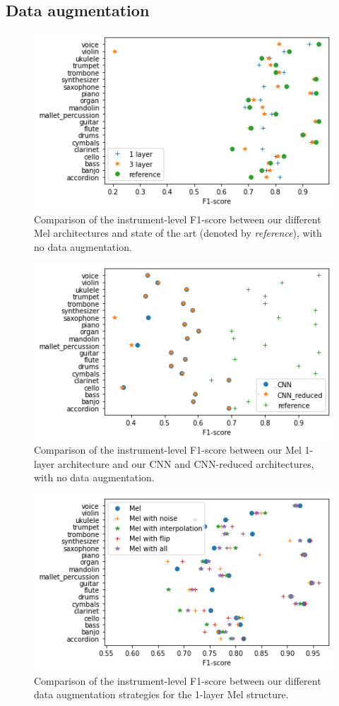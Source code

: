 \documentclass[final]{cvpr}
\begin{document}
\subsection{Data augmentation}

\begin{figure}
	\centering
	\includegraphics[scale = 0.5]{to_ref.png}
	\caption{Comparison of the instrument-level F1-score between our different Mel architectures and state of the art (denoted by \textit{reference}), with no data augmentation.}
	\label{to_ref}
\end{figure}
\begin{figure}
	\centering
	\includegraphics[scale = 0.5]{cnn_plot.png}
	\caption{Comparison of the instrument-level F1-score between our Mel 1-layer architecture and our CNN and CNN-reduced architectures, with no data augmentation.}
	\label{cnn_plot}
\end{figure}
\begin{figure}
	\centering
	\includegraphics[scale = 0.5]{mel_data.png}
	\caption{Comparison of the instrument-level F1-score between our different data augmentation strategies for the 1-layer Mel structure.}
	\label{mel_data}
\end{figure}
\end{document}
